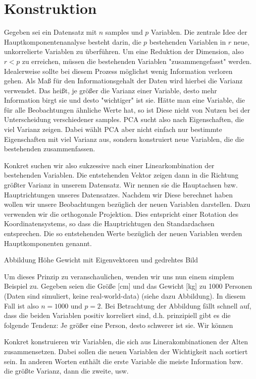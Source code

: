 \section{Konstruktion}

Gegeben sei ein Datensatz mit $n$ samples und $p$ Variablen. Die zentrale Idee der Hauptkomponentenanalyse besteht darin, die $p$ bestehenden Variablen in $r$ neue, unkorrelierte Variablen zu überführen. Um eine Reduktion der Dimension, also $r < p$ zu erreichen, müssen die bestehenden Variablen "zusammengefasst" werden. Idealerweise sollte bei diesem Prozess möglichst wenig Information verloren gehen. Als Maß für den Informationsgehalt der Daten wird hierbei die Varianz verwendet. Das heißt, je größer die Varianz einer Variable, desto mehr Information birgt sie und desto "wichtiger" ist sie. Hätte man eine Variable, die für alle Beobachtungen ähnliche Werte hat, so ist Diese nicht von Nutzen bei der Unterscheidung verschiedener samples. PCA sucht also nach Eigenschaften, die viel Varianz zeigen. Dabei wählt PCA aber nicht einfach nur bestimmte Eigenschaften mit viel Varianz aus, sondern konstruiert neue Variablen, die die bestehenden zusammenfassen.

Konkret suchen wir also sukzessive nach einer Linearkombination der bestehenden Variablen. Die entstehenden Vektor zeigen dann in die Richtung größter Varianz in unserem Datensatz. Wir nennen sie die Hauptachsen bzw. Hauptrichtungen unseres Datensatzes. Nachdem wir Diese berechnet haben wollen wir unsere Beobachtungen bezüglich der neuen Variablen darstellen. Dazu verwenden wir die orthogonale Projektion. Dies entspricht einer Rotation des Koordinatensystems, so dass die Hauptrichtugen den Standardachsen entsprechen. Die so entstehenden Werte bezüglich der neuen Variablen werden Hauptkomponenten genannt. 

Abbildung Höhe Gewicht mit Eigenvektoren und gedrehtes Bild

Um dieses Prinzip zu veranschaulichen, wenden wir uns nun einem simplem Beispiel zu. Gegeben seien die Größe [cm] und das Gewicht [kg] zu 1000 Personen (Daten sind simuliert, keine real-world-data) (siehe dazu Abbildung). In diesem Fall ist also $n = 1000$ und $p = 2$. Bei Betrachtung der Abbildung fällt schnell auf, dass die beiden Variablen positiv korreliert sind, d.h. prinzipiell gibt es die folgende Tendenz: Je größer eine Person, desto schwerer ist sie. Wir können

Konkret konstruieren wir Variablen, die sich aus Linerakombinationen der Alten zusammensetzen. Dabei sollen die neuen Variablen der Wichtigkeit nach sortiert sein. In anderen Worten enthält die erste Variable die meiste Information bzw. die größte Varianz, dann die zweite, usw.

